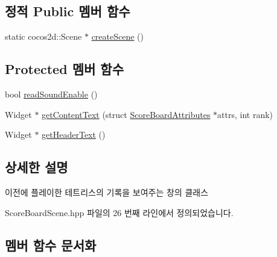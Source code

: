 \subsection*{정적 Public 멤버 함수}
\begin{DoxyCompactItemize}
\item 
static cocos2d\+::\+Scene $\ast$ \hyperlink{class_tetris_1_1_cocos2d_scenes_1_1_score_board_scene_abedba06354b1f03d3f395e4c1841b8a6}{create\+Scene} ()
\end{DoxyCompactItemize}
\subsection*{Protected 멤버 함수}
\begin{DoxyCompactItemize}
\item 
bool \hyperlink{class_tetris_1_1_cocos2d_scenes_1_1_score_board_scene_a451d25787dec38631575bc240b86c897}{read\+Sound\+Enable} ()
\item 
Widget $\ast$ \hyperlink{class_tetris_1_1_cocos2d_scenes_1_1_score_board_scene_a1fa0140e51fbae6cffb210487073b549}{get\+Content\+Text} (struct \hyperlink{struct_tetris_1_1_d_b_management_1_1_score_board_attributes}{Score\+Board\+Attributes} $\ast$attrs, int rank)
\item 
Widget $\ast$ \hyperlink{class_tetris_1_1_cocos2d_scenes_1_1_score_board_scene_a89a944c51155ffa16474e406a1103753}{get\+Header\+Text} ()
\end{DoxyCompactItemize}


\subsection{상세한 설명}
이전에 플레이한 테트리스의 기록을 보여주는 창의 클래스 

Score\+Board\+Scene.\+hpp 파일의 26 번째 라인에서 정의되었습니다.



\subsection{멤버 함수 문서화}
\mbox{\label{class_tetris_1_1_cocos2d_scenes_1_1_score_board_scene_afe728259a0507c6fdec598ef5334a3a5}} 

